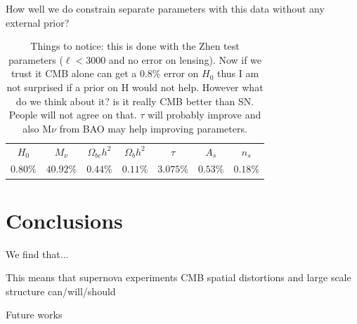 \documentclass[aps,prl,preprint,groupedaddress]{revtex4-1}
\begin{document}
\begin{table}[htdp]
\caption{How well we do constrain separate parameters with this data without any external prior?}
\begin{center}
\begin{tabular}{|c|c|c|c|c|c|c|}
\hline
$H_{0}$ &$ M_{\nu}$ &$\Omega_{bc}h^{2}$&$\Omega_{b}h^{2}$&$\tau$&$A_{s}$&$n_{s}$ \\
$0.80 \%$&$40.92\%$&$0.44\%$&$0.11\%$&$3.075\%$&$0.53\%$&$0.18\%$\\

\hline


\end{tabular}
\end{center}
\label{default}
\caption{Things to notice: this is done with the Zhen test parameters ($\ell<3000$ and no error on lensing). Now if we trust it CMB alone can get a $0.8\%$ error on $H_{0}$ thus I am not surprised if a prior on H would not help. However what do we think about it? is it really CMB better than SN. People will not agree on that. $\tau$ will probably improve and also M$\nu$ from BAO may help improving parameters.}
\end{table}%


%



\section{Conclusions \label{sec:conclusions}}
We find that...

This means that supernova experiments CMB spatial distortions and large scale structure can/will/should

Future works

\end{document}
